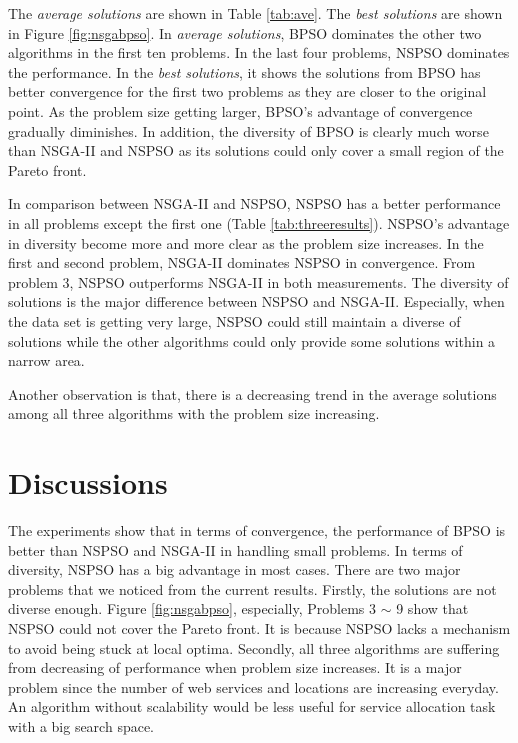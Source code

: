 The \emph{average solutions} are shown in Table \ref{tab:ave}. The \emph{best solutions} are shown in Figure \ref{fig:nsgabpso}.
In \emph{average solutions}, BPSO dominates the other two algorithms in the first ten problems. In the last four problems, 
NSPSO dominates the performance. 
In the \emph{best solutions}, 
it shows the solutions from BPSO has better convergence for the first two problems as they are closer to the original point. As the problem size getting larger,
BPSO's advantage of convergence gradually diminishes. 
In addition, the diversity of BPSO is clearly much worse than NSGA-II and NSPSO as its solutions could 
only cover a small region of the Pareto front.

In comparison between NSGA-II and NSPSO, NSPSO has a better performance in all problems except the first one (Table \ref{tab:threeresults}). NSPSO's advantage in diversity become more and more clear as the problem size increases.
In the first and second problem, NSGA-II dominates NSPSO in convergence. From problem 3, NSPSO outperforms
NSGA-II in both measurements. The diversity of solutions is the major difference between NSPSO and NSGA-II. 
Especially, when the data set is getting very large, NSPSO could still maintain a diverse of solutions while 
the other algorithms could only provide some solutions within a narrow area.

Another observation is that, there is a decreasing trend in the average solutions among all three algorithms with the problem size increasing.

\section{Discussions}
The experiments show that in terms of convergence, 
the performance of BPSO is better than NSPSO and NSGA-II in handling small problems. 
In terms of diversity, NSPSO has a big advantage in most cases.
There are two major problems that we noticed from the current results.
Firstly, the solutions are not diverse enough. Figure \ref{fig:nsgabpso}, especially, Problems 3 $\sim$ 9 show that NSPSO could not cover the Pareto front.
It is because NSPSO lacks a mechanism to avoid being stuck at local optima.
Secondly, all three algorithms are suffering from decreasing of performance when problem size increases. 
It is a major problem since the number of web services and locations are increasing everyday.
An algorithm without scalability would be less useful for service allocation task with a big search space.

